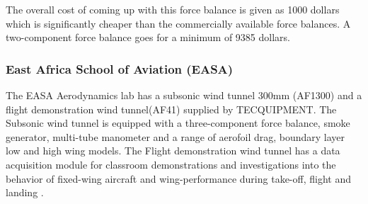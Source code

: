 The overall cost of coming up with this force balance is given as 1000 dollars which is significantly cheaper than the commercially available force balances. A two-component force balance goes for a minimum of 9385 dollars.
\subsubsection{East Africa School of Aviation (EASA)}
The EASA Aerodynamics lab has a subsonic wind tunnel 300mm (AF1300) and a flight demonstration wind tunnel(AF41) supplied by TECQUIPMENT. The Subsonic wind tunnel is equipped with a three-component force balance, smoke generator, multi-tube manometer and a range of aerofoil drag, boundary layer low and high wing models. The Flight demonstration wind tunnel has a data acquisition module for classroom demonstrations and investigations into the behavior of fixed-wing aircraft and wing-performance during take-off, flight and landing \cite{TEC}.

